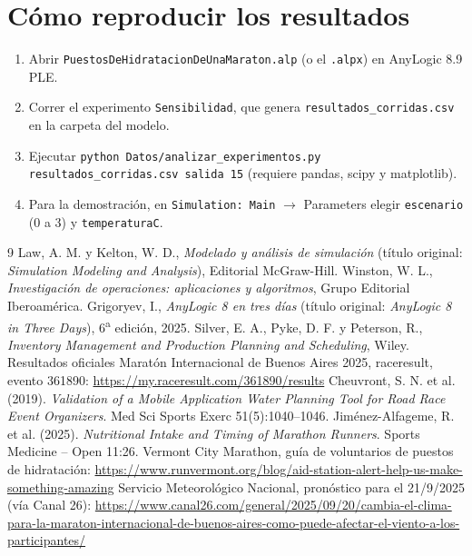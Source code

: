 \documentclass[11pt,a4paper]{article}
\begin{document}
\section{Cómo reproducir los resultados}

\begin{enumerate}
    \item Abrir \texttt{PuestosDeHidratacionDeUnaMaraton.alp} (o el \texttt{.alpx}) en AnyLogic 8.9 PLE.
    \item Correr el experimento \texttt{Sensibilidad}, que genera \texttt{resultados\_corridas.csv} en la carpeta del modelo.
    \item Ejecutar \texttt{python Datos/analizar\_experimentos.py resultados\_corridas.csv salida 15} (requiere pandas, scipy y matplotlib).
    \item Para la demostración, en \texttt{Simulation: Main} $\rightarrow$ Parameters elegir \texttt{escenario} (0 a 3) y \texttt{temperaturaC}.
\end{enumerate}

\begin{thebibliography}{9}
 Law, A. M. y Kelton, W. D., \emph{Modelado y análisis de
simulación} (título original: \emph{Simulation Modeling and Analysis}),
Editorial McGraw-Hill.
 Winston, W. L., \emph{Investigación de operaciones:
aplicaciones y algoritmos}, Grupo Editorial Iberoamérica.
 Grigoryev, I., \emph{AnyLogic 8 en tres días} (título
original: \emph{AnyLogic 8 in Three Days}), 6\textsuperscript{a} edición, 2025.
 Silver, E. A., Pyke, D. F. y Peterson, R., \emph{Inventory
Management and Production Planning and Scheduling}, Wiley.
 Resultados oficiales Maratón Internacional de Buenos Aires 2025,
raceresult, evento 361890: \url{https://my.raceresult.com/361890/results}
 Cheuvront, S. N. et al. (2019). \emph{Validation of a Mobile
Application Water Planning Tool for Road Race Event Organizers}. Med Sci Sports
Exerc 51(5):1040--1046.
 Jiménez-Alfageme, R. et al. (2025). \emph{Nutritional Intake and
Timing of Marathon Runners}. Sports Medicine -- Open 11:26.
 Vermont City Marathon, guía de voluntarios de puestos de
hidratación: \url{https://www.runvermont.org/blog/aid-station-alert-help-us-make-something-amazing}
 Servicio Meteorológico Nacional, pronóstico para el 21/9/2025 (vía Canal 26):
\url{https://www.canal26.com/general/2025/09/20/cambia-el-clima-para-la-maraton-internacional-de-buenos-aires-como-puede-afectar-el-viento-a-los-participantes/}
\end{thebibliography}
\end{document}
